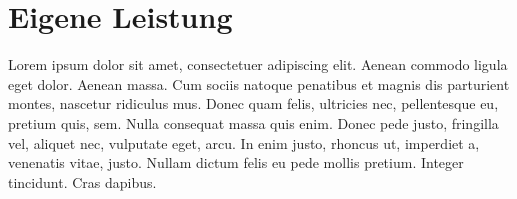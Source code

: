 \section{Eigene Leistung}
\label{subsec:Eigene Leistung}

Lorem ipsum dolor sit amet, consectetuer adipiscing elit. Aenean commodo ligula eget dolor. Aenean massa. Cum sociis natoque penatibus et magnis dis parturient montes, nascetur ridiculus mus. Donec quam felis, ultricies nec, pellentesque eu, pretium quis, sem. Nulla consequat massa quis enim. Donec pede justo, fringilla vel, aliquet nec, vulputate eget, arcu. In enim justo, rhoncus ut, imperdiet a, venenatis vitae, justo. Nullam dictum felis eu pede mollis pretium. Integer tincidunt. Cras dapibus.


